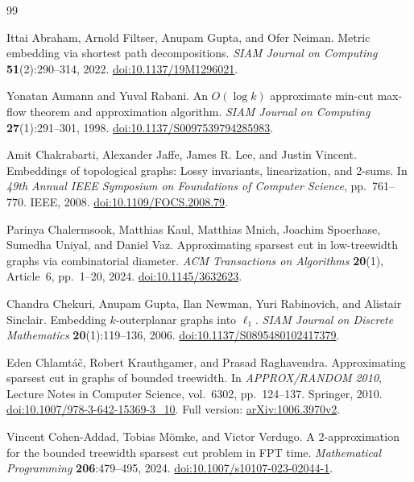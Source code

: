 \begin{thebibliography}{99}

Ittai Abraham, Arnold Filtser, Anupam Gupta, and Ofer Neiman.
Metric embedding via shortest path decompositions.
\emph{SIAM Journal on Computing} \textbf{51}(2):290--314, 2022.
\href{https://doi.org/10.1137/19M1296021}{doi:10.1137/19M1296021}.

Yonatan Aumann and Yuval Rabani.
An $O(\log k)$ approximate min-cut max-flow theorem and approximation algorithm.
\emph{SIAM Journal on Computing} \textbf{27}(1):291--301, 1998.
\href{https://doi.org/10.1137/S0097539794285983}{doi:10.1137/S0097539794285983}.

Amit Chakrabarti, Alexander Jaffe, James R. Lee, and Justin Vincent.
Embeddings of topological graphs: Lossy invariants, linearization, and 2-sums.
In \emph{49th Annual IEEE Symposium on Foundations of Computer Science},
pp.~761--770. IEEE, 2008.
\href{https://doi.org/10.1109/FOCS.2008.79}{doi:10.1109/FOCS.2008.79}.

Parinya Chalermsook, Matthias Kaul, Matthias Mnich, Joachim Spoerhase,
Sumedha Uniyal, and Daniel Vaz.
Approximating sparsest cut in low-treewidth graphs via combinatorial diameter.
\emph{ACM Transactions on Algorithms} \textbf{20}(1), Article~6,
pp.~1--20, 2024.
\href{https://doi.org/10.1145/3632623}{doi:10.1145/3632623}.

Chandra Chekuri, Anupam Gupta, Ilan Newman, Yuri Rabinovich, and Alistair Sinclair.
Embedding $k$-outerplanar graphs into $\ell_1$.
\emph{SIAM Journal on Discrete Mathematics} \textbf{20}(1):119--136, 2006.
\href{https://doi.org/10.1137/S0895480102417379}{doi:10.1137/S0895480102417379}.

Eden Chlamt{\'a}{\v c}, Robert Krauthgamer, and Prasad Raghavendra.
Approximating sparsest cut in graphs of bounded treewidth.
In \emph{APPROX/RANDOM 2010}, Lecture Notes in Computer Science,
vol.~6302, pp.~124--137. Springer, 2010.
\href{https://doi.org/10.1007/978-3-642-15369-3_10}{doi:10.1007/978-3-642-15369-3\_10}.
Full version: \href{https://arxiv.org/abs/1006.3970v2}{arXiv:1006.3970v2}.

Vincent Cohen-Addad, Tobias M{\"o}mke, and Victor Verdugo.
A 2-approximation for the bounded treewidth sparsest cut problem in FPT time.
\emph{Mathematical Programming} \textbf{206}:479--495, 2024.
\href{https://doi.org/10.1007/s10107-023-02044-1}{doi:10.1007/s10107-023-02044-1}.


\end{thebibliography}
